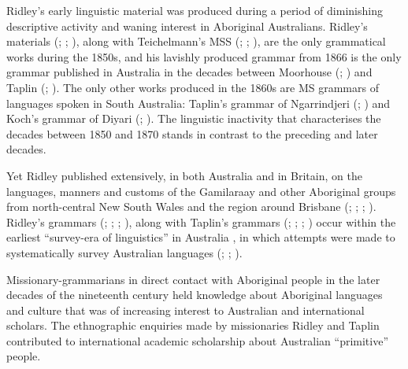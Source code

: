 Ridley’s early linguistic material was produced during a period of diminishing descriptive activity and waning interest in Aboriginal Australians. Ridley’s materials (\citeyear{ridley_kamilaroi_1855}; \citeyear{ridley_kamilaroi_1855-1}; \citeyear{ridley_gurre_1856}), along with Teichelmann’s MSS (\citeyear{teichelmann_dictionary_1857}; \citeyear{teichelmann_annotations_1858}; ), are the only grammatical works during the 1850s, and his lavishly produced grammar from 1866 is the only grammar published in Australia in the decades between Moorhouse (\citeyear{moorhouse_vocabulary_1846}; ) and Taplin (\citet{taplin_narrinyeri_1874}; ). The only other works produced in the 1860s are MS grammars of languages spoken in South Australia: Taplin’s grammar of Ngarrindjeri (\citeyear{taplin_vocabulary_1867}; ) and Koch’s grammar of Diyari (\citeyear{koch_untitled_1868}; ). The linguistic inactivity that characterises the decades between 1850 and 1870 stands in contrast to the preceding and later decades.

Yet Ridley published extensively, in both Australia and in Britain, on the languages, manners and customs of the Gamilaraay and other Aboriginal groups from north-central New South Wales and the region around Brisbane (\citeyear{ridley_kamilaroi_1855-1}; \citeyear{ridley_kamilaroi_1856}; \citeyear{ridley_kamilaroi_1866}; \citeyear{ridley_kamilaroi_1875}). Ridley’s grammars (\citeyear{ridley_kamilaroi_1855}; \citeyear{ridley_kamilaroi_1855-1}; \citeyear{ridley_kamilaroi_1866}; \citeyear{ridley_kamilaroi_1875}), along with Taplin’s grammars (\citeyear{taplin_vocabulary_1867}; \citeyear{taplin_notes_1872}; \citeyear{taplin_grammar_1878}; ) occur within the earliest “survey-era of linguistics” in Australia \citep{mcgregor_encountering_2008}, in which attempts were made to systematically survey Australian languages (\citealt{taplin_1879a_nodate}; \citealt{smyth_aborigines_1878}; \citealt{curr_australian_1886}).

Missionary-grammarians in direct contact with Aboriginal people in the later decades of the nineteenth century held knowledge about Aboriginal languages and culture that was of increasing interest to Australian and international scholars. The ethnographic enquiries made by missionaries Ridley and Taplin contributed to international academic scholarship about Australian “primitive” people. 

